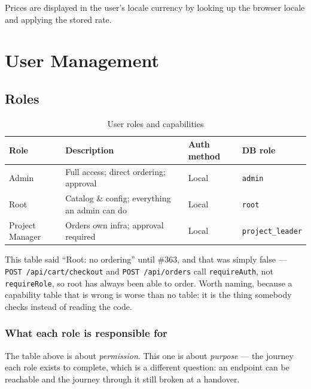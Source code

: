 \documentclass[12pt,a4paper,twoside]{report}
\newcommand{\code}[1]{\texttt{#1}}
\begin{document}
Prices are displayed in the user's locale currency by looking up the
browser locale and applying the stored rate.

\chapter{User Management}
\label{ch:users}

\section{Roles}

\begin{table}[H]
  \centering
  \caption{User roles and capabilities}
  \begin{tabularx}{\linewidth}{@{}l>{\raggedright\arraybackslash}Xll@{}}
    \toprule
    \textbf{Role} & \textbf{Description} &
      \textbf{Auth method} & \textbf{DB role} \\
    \midrule
    Admin         & Full access; direct ordering; approval & Local & \code{admin} \\
    Root    & Catalog \& config; everything an admin can do & Local & \code{root} \\
    Project Manager  & Orders own infra; approval required     & Local & \code{project\_leader} \\
    \bottomrule
  \end{tabularx}
\end{table}

\noindent This table said ``Root: no ordering'' until \#363, and that was
simply false --- \code{POST /api/cart/checkout} and \code{POST /api/orders}
call \code{requireAuth}, not \code{requireRole}, so root has always been able
to order. Worth naming, because a capability table that is wrong is worse than
no table: it is the thing somebody checks instead of reading the code.

\subsection*{What each role is responsible for}
\label{sec:role-responsibilities}

The table above is about \emph{permission}. This one is about \emph{purpose} —
the journey each role exists to complete, which is a different question: an
endpoint can be reachable and the journey through it still broken at a handover.
\end{document}
